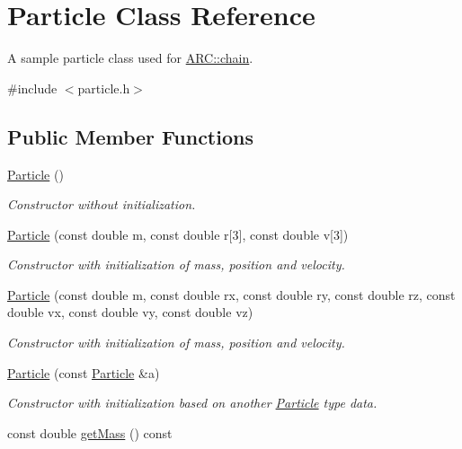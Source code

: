 \hypertarget{classParticle}{}\section{Particle Class Reference}
\label{classParticle}


A sample particle class used for \hyperlink{classARC_1_1chain}{A\+R\+C\+::chain}.  




{\ttfamily \#include $<$particle.\+h$>$}

\subsection*{Public Member Functions}
\begin{DoxyCompactItemize}
\item 
\hyperlink{classParticle_a40f4c7e248029d72e7714b7802d5e5e1}{Particle} ()
\begin{DoxyCompactList}\small\item\em Constructor without initialization. \end{DoxyCompactList}\item 
\hyperlink{classParticle_a5200252c69608a5cd6bd7be6ff03ae6c}{Particle} (const double m, const double r\mbox{[}3\mbox{]}, const double v\mbox{[}3\mbox{]})
\begin{DoxyCompactList}\small\item\em Constructor with initialization of mass, position and velocity. \end{DoxyCompactList}\item 
\hyperlink{classParticle_ac189ad370eb0a2c05869249d672a4f06}{Particle} (const double m, const double rx, const double ry, const double rz, const double vx, const double vy, const double vz)
\begin{DoxyCompactList}\small\item\em Constructor with initialization of mass, position and velocity. \end{DoxyCompactList}\item 
\hyperlink{classParticle_a602b45f0258d4e61d9c07f2c91d4f497}{Particle} (const \hyperlink{classParticle}{Particle} \&a)
\begin{DoxyCompactList}\small\item\em Constructor with initialization based on another \hyperlink{classParticle}{Particle} type data. \end{DoxyCompactList}\item 
const double \hyperlink{classParticle_ad55c2cb0a6e50a48de72d6c324b00d44}{get\+Mass} () const 

\end{DoxyCompactItemize}
